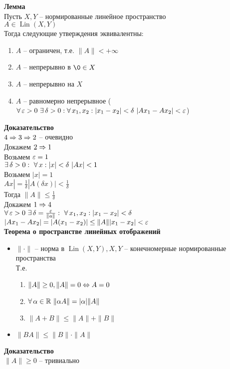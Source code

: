 \documentclass[12pt]{article}
\DeclareMathOperator{\Lin}{Lin}
\begin{document}
\textbf{Лемма}\\
Пусть $X, Y$ -- нормированные линейное пространство\\
$A \in \Lin(X, Y)$\\
Тогда следующие утверждения эквивалентны:\\
\begin{enumerate}
    \item $A$ -- ограничен, т.е. $\|A\| < +\infty$
    \item $A$ -- непрерывно в $\0 \in X$
    \item $A$ -- непрерывно на $X$
    \item $A$ -- равномерно непрерывное ($\fall \eps > 0\ \ex \delta > 0: \fall x_1, x_2: |x_1-x_2| < \delta\ |Ax_1 - Ax_2| < \eps$)
\end{enumerate}
\textbf{Доказательство}\\
$4 \Rightarrow 3 \Rightarrow 2$ -- очевидно\\
Докажем $2 \Rightarrow 1$\\
Возьмем $\varepsilon = 1$\\
$\ex \delta > 0:\ \fall x: |x| < \delta\ |Ax| < 1$\\
Возьмем $|x| = 1$\\
$Ax| = \frac1\delta|A(\delta x)| < \frac1\delta$\\
Тогда $\|A\| \leq \frac1\delta$\\
Докажем $1 \Rightarrow 4$\\
$\forall\, \varepsilon > 0\ \exists\, \delta = \frac{\varepsilon}{\|a\|}:\ \forall\, x_1, x_2: |x_1-x_2| < \delta$\\
$|Ax_1-Ax_2| = |A(x_1-x_2)| \leq \|A\||x_1-x_2| < \varepsilon$\\
\textbf{Теорема о пространстве линейных отображений}
\begin{itemize}
    \item $\|\cdot \|$ -- норма в $\Lin(X, Y), X, Y$ -- конечномерные нормированные пространства\\
    Т.е.\begin{enumerate}
        \item $\|A\| \geq 0, \|A\| = 0 \Leftrightarrow A = 0$
        \item $\forall\, \alpha \in \mathbb{R}\ \|\alpha A\| = |\alpha| \|A\|$
        \item $\|A + B\| \leq \|A\|+\|B\|$
    \end{enumerate}
    \item $\|BA\|\leq \|B\|\cdot\|A\|$
\end{itemize}
\textbf{Доказательство}\\
$\|A\| \geq 0$ -- тривиально\\
\end{document}
